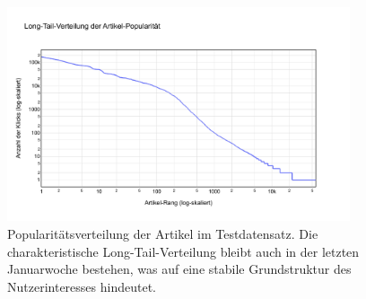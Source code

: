 
\begin{figure}[H]
    \centering
    \includegraphics[width=0.9\textwidth]{content/figures/svg/artikel_verteilung_test.pdf}
    \caption{Popularitätsverteilung der Artikel im Testdatensatz. Die charakteristische Long-Tail-Verteilung bleibt auch in der letzten Januarwoche bestehen, was auf eine stabile Grundstruktur des Nutzerinteresses hindeutet.}
    \label{fig:artikelverteilung_test}
\end{figure}